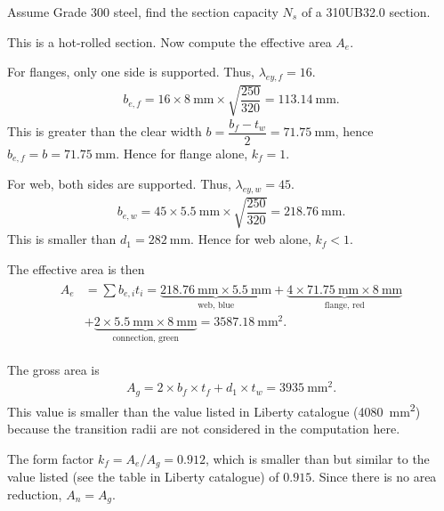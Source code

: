 \begin{exmp}
Assume Grade 300 steel, find the section capacity $N_s$ of a 310UB32.0 section.
\end{exmp}
\begin{solution}
\begin{minipage}{5cm}\centering
\end{minipage}
\begin{minipage}{.99\linewidth-5cm}
This is a hot-rolled section.
Now compute the effective area $A_e$.

For flanges, only one side is supported.
Thus, $\lambda_{ey,f}=16$.
\begin{gather*}
b_{e,f}=16\times\SI{8}{\mm}\times\sqrt{\dfrac{250}{320}}=\SI{113.14}{\mm}.
\end{gather*}
This is greater than the clear width $b=\dfrac{b_f-t_w}{2}=\SI{71.75}{\mm}$, hence $b_{e,f}=b=\SI{71.75}{\mm}$.
Hence for flange alone, $k_f=1$.

For web, both sides are supported.
Thus, $\lambda_{ey,w}=45$.
\begin{gather*}
b_{e,w}=45\times\SI{5.5}{\mm}\times\sqrt{\dfrac{250}{320}}=\SI{218.76}{\mm}.
\end{gather*}
This is smaller than $d_1=\SI{282}{\mm}$.
Hence for web alone, $k_f<1$.
\end{minipage}

The effective area is then
\begin{gather*}
\begin{split}
A_e&=\sum{}b_{e,i}t_i=\underbrace{\SI{218.76}{\mm}\times\SI{5.5}{\mm}}_\text{web, blue}+\underbrace{4\times\SI{71.75}{\mm}\times\SI{8}{\mm}}_\text{flange, red}\\
&+\underbrace{2\times\SI{5.5}{\mm}\times\SI{8}{\mm}}_\text{connection, green}=\SI{3587.18}{\mm^2}.
\end{split}
\end{gather*}

The gross area is
\begin{gather*}
A_g=2\times{}b_f\times{}t_f+d_1\times{}t_w=\SI{3935}{\mm^2}.
\end{gather*}
This value is smaller than the value listed in Liberty catalogue (\SI{4080}{\mm^2}) because the transition radii are not considered in the computation here.

The form factor $k_f=A_e/A_g=0.912$, which is smaller than but similar to the value listed (see the table in Liberty catalogue) of $0.915$.
Since there is no area reduction, $A_n=A_g$.


\end{solution}
